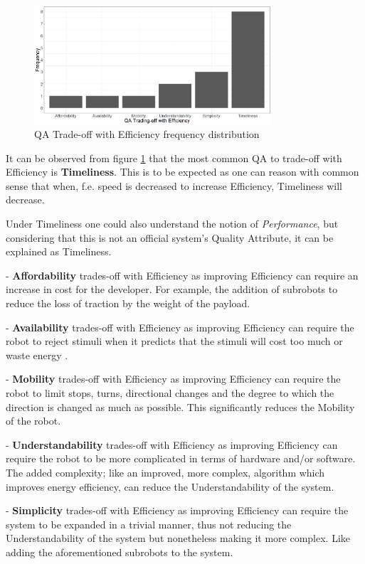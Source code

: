 \begin{figure}
    \includegraphics[width=250pt]{figures/trade_off_freq.png}
    \caption{QA Trade-off with Efficiency frequency distribution}
    \label{fig:trade_off_freq}
\end{figure}

\vspace{5mm}

It can be observed from figure \ref{fig:trade_off_freq} that the most common QA to trade-off with Efficiency is \textbf{Timeliness}.
This is to be expected as one can reason with common sense that when, f.e. speed is decreased to increase Efficiency, Timeliness will decrease.

Under Timeliness one could also understand the notion of \textit{Performance}, but considering that this is not an official
system's Quality Attribute, it can be explained as Timeliness.

- \textbf{Affordability} trades-off with Efficiency as improving Efficiency can require an increase in cost for the developer.
For example, the addition of subrobots to reduce the loss of traction by the weight of the payload.

- \textbf{Availability} trades-off with Efficiency as improving Efficiency can require the robot to reject stimuli when it predicts
that the stimuli will cost too much or waste energy \cite{kirtay2013humanoid_emotion}.

- \textbf{Mobility} trades-off with Efficiency as improving Efficiency can require the robot to limit stops, turns, directional changes and the degree 
to which the direction is changed as much as possible. This significantly reduces the Mobility of the robot.

- \textbf{Understandability} trades-off with Efficiency as improving Efficiency can require the robot to be more complicated in terms of hardware
and/or software. 
The added complexity; like an improved, more complex, algorithm which improves energy efficiency, can reduce the Understandability of the system.

- \textbf{Simplicity} trades-off with Efficiency as improving Efficiency can require the system to be expanded in a trivial manner, thus not
reducing the Understandability of the system but nonetheless making it more complex. Like adding the aforementioned subrobots to the system.

